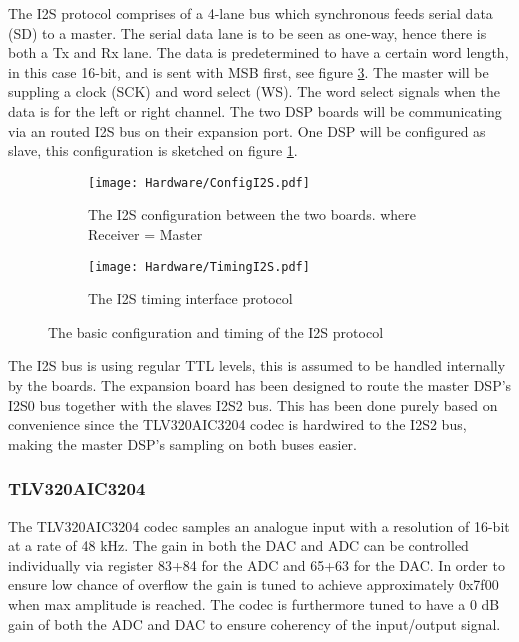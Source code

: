 The I2S protocol comprises of a 4-lane bus which synchronous feeds serial data (SD) to a master. The serial data lane is to be seen as one-way, hence there is both a Tx and Rx lane. The data is predetermined to have a certain word length, in this case 16-bit, and is sent with MSB first, see figure \ref{fig:I2STiming}. The master will be suppling a clock (SCK) and word select (WS). The word select signals when the data is for the left or right channel. The two DSP boards will be communicating via an routed I2S bus on their expansion port. One DSP will be configured as slave, this configuration is sketched on figure \ref{fig:I2Sconfig}. 

\begin{figure}[H]
	\centering
	\begin{subfigure}[b]{.45\textwidth}
		\centering
		\texttt{[image: Hardware/ConfigI2S.pdf]}
		\caption{The I2S configuration between the two boards. where Receiver = Master}
		\label{fig:I2Sconfig}
	\end{subfigure}
	\hfill
	\begin{subfigure}[b]{.45\textwidth}
		\centering
		\texttt{[image: Hardware/TimingI2S.pdf]}
		\caption{The I2S timing interface protocol}
		\label{fig:I2STiming}
	\end{subfigure}	
	\caption{The basic configuration and timing of the I2S protocol}
\end{figure}

The I2S bus is using regular TTL levels, this is assumed to be handled internally by the boards. The expansion board has been designed to route the master DSP's I2S0 bus together with the slaves I2S2 bus. This has been done purely based on convenience since the TLV320AIC3204 codec is hardwired to the I2S2 bus, making the master DSP's sampling on both buses easier.

\subsubsection*{TLV320AIC3204}

The TLV320AIC3204 codec samples an analogue input with a resolution of 16-bit at a rate of 48 kHz. The gain in both the DAC and ADC can be controlled individually via register 83+84 for the ADC and 65+63 for the DAC. In order to ensure low chance of overflow the gain is tuned to achieve approximately 0x7f00 when max amplitude is reached. The codec is furthermore tuned to have a 0 dB gain of both the ADC and DAC to ensure coherency of the input/output signal.

